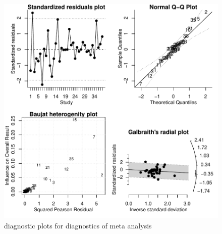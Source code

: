 \documentclass[11pt, a4paper]{article} %
\begin{document}
\begin{figure}
\captionsetup{width=0.6\textwidth}
\centering
\includegraphics[width=1\textwidth]{sweave_document_TB-Diagnostics}
\caption{diagnostic plots for diagnostics of meta analysis}
\label{fig:diagnostics}
\end{figure}
\end{document}
